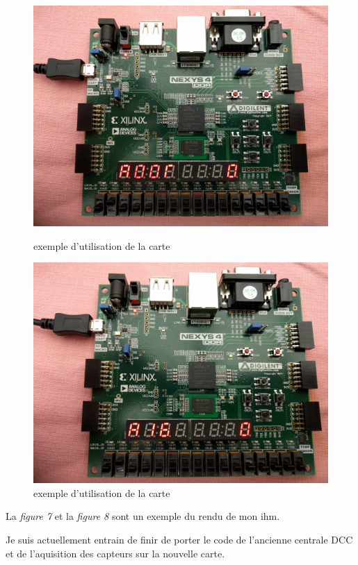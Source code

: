 \begin{figure}[ht]
    \begin{minipage}[c]{.46\linewidth}
        \centering
        \includegraphics[scale=0.04]{exe_add.jpg}
        \caption{exemple d'utilisation de la carte}
        \label{fig7}
    \end{minipage}
    \hfill%
    \begin{minipage}[c]{.46\linewidth}
        \centering
        \includegraphics[scale=0.04]{exe_aigui.jpg}
        \caption{exemple d'utilisation de la carte}
        \label{fig8}
    \end{minipage}
\end{figure}

La \emph{figure 7} et la \emph{figure 8} sont un exemple du rendu de
mon ihm.

Je suis actuellement entrain de finir de porter le code de l'ancienne
centrale DCC et de l'aquisition des capteurs sur la nouvelle carte.

\newpage





